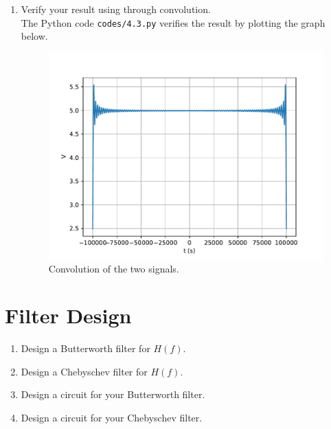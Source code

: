 \documentclass[journal,12pt,twocolumn]{IEEEtran}
\renewcommand\thesection{\arabic{section}}
\begin{document}
\begin{enumerate}[label=\thesection.\arabic*
,ref=\thesection.\theenumi]
\item Verify your result using through convolution. \\
\solution The Python code \texttt{codes/4.3.py} verifies the result
by plotting the graph below.
\begin{figure}[!ht]
\includegraphics[width=\columnwidth]{figs/4.3.pdf}
\caption{Convolution of the two signals.}
\label{eq:fig-conv}
\end{figure}
\end{enumerate}
\section{Filter Design}
\begin{enumerate}[label=\thesection.\arabic*
,ref=\thesection.\theenumi]
\item Design a Butterworth filter for $H(f)$.
\item Design a Chebyschev filter for $H(f)$.
\item Design a circuit for your Butterworth filter.
\item Design a circuit for your Chebyschev filter.
\end{enumerate}
\end{document}
